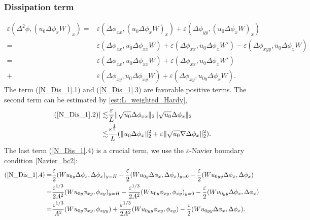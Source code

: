 \documentclass[reqno, 11pt]{amsart}
\theoremstyle{plain}
\theoremstyle{definition}
\theoremstyle{remark}
\numberwithin{equation}{section}
\begin{document}
\subsubsection{Dissipation term}
\begin{equation}\label{N_Dis_1}
\begin{aligned}
\varepsilon (\Delta^2 \phi, (u_0 \Delta\phi_x W)_x) =& \varepsilon (\Delta \phi_{xx}, (u_0 \Delta\phi_x W)_x) + \varepsilon (\Delta \phi_{yy}, (u_0 \Delta\phi_x W)_x)\\
=&  \varepsilon (\Delta \phi_{xx}, u_0 \Delta\phi_{xx} W)  +  \varepsilon (\Delta \phi_{xx}, u_0 \Delta\phi_{x} W') - \varepsilon (\Delta \phi_{xyy}, u_0 \Delta\phi_x W)\\
=&  \varepsilon (\Delta \phi_{xx}, u_0 \Delta\phi_{xx} W)  +  \varepsilon (\Delta \phi_{xx}, u_0 \Delta\phi_{x} W')\\
+&  \varepsilon (\Delta \phi_{xy}, u_0 \Delta\phi_{xy} W) +  \varepsilon (\Delta \phi_{xy}, u_{0y} \Delta\phi_x W).
\end{aligned}
\end{equation}
The term (\ref{N_Dis_1}.1) and (\ref{N_Dis_1}.3) are favorable positive terms. The second term can be estimated by \eqref{est:L_weighted_Hardy},
\begin{equation}\label{N_Dis_1_1}
\begin{aligned}
|(\ref{N_Dis_1}.2)| \lesssim & \frac{\varepsilon}{L} \| \sqrt{u_0}\Delta \phi_{xx} \|_2 \| \sqrt{u_0}\Delta \phi_{x} \|_2\\
\lesssim & \frac{\varepsilon^{\frac{1}{3}}}{L} (\|u_0 \Delta \phi_x\|_2^2  +  \varepsilon \| \sqrt{u_0} \nabla \Delta \phi_{x} \|_2^2).
\end{aligned}
\end{equation}
The last term (\ref{N_Dis_1}.4) is a crucial term, we use the $\varepsilon$-Navier boundary condition \eqref{Navier_bc2}:
\begin{equation}\label{N_Dis_1_2}
\begin{aligned}
(\ref{N_Dis_1}.4) =& \frac{\varepsilon}{2} (W u_{0y} \Delta \phi_x , \Delta \phi_x)_{y=H} - \frac{\varepsilon}{2} (W u_{0y} \Delta \phi_x , \Delta \phi_x)_{y=0} - \frac{\varepsilon}{2} (W u_{0yy} \Delta \phi_x, \Delta \phi_x) \\
=& \frac{\varepsilon^{1/3}}{2A^2} (W u_{0y} \phi_{xy} ,\phi_{xy})_{y=H} - \frac{\varepsilon^{1/3}}{2A^2} (W u_{0y} \phi_{xy} ,\phi_{xy})_{y=0} - \frac{\varepsilon}{2} (W u_{0yy} \Delta \phi_x, \Delta \phi_x)\\
=& \frac{\varepsilon^{1/3}}{A^2} (W u_{0y} \phi_{xy} ,\phi_{xyy}) + \frac{\varepsilon^{1/3}}{2A^2} (W u_{0yy} \phi_{xy} ,\phi_{xy}) - \frac{\varepsilon}{2} (W u_{0yy} \Delta \phi_x, \Delta \phi_x).
\end{aligned}
\end{equation}
\end{document}
